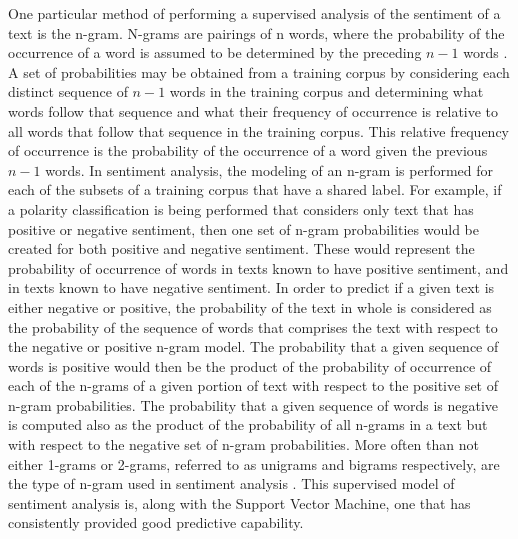 \documentclass[letterpaper, 10 pt, conference]{ieeeconf}
\begin{document}
One particular method of performing a supervised analysis of the sentiment of a text is the n-gram. N-grams are pairings of n words, where the probability of the occurrence of a word is assumed to be determined by the preceding $n-1$ words \textcolor{gray}{\cite{Zhou}}. A set of probabilities may be obtained from a training corpus by considering each distinct sequence of $n-1$ words in the training corpus and determining what words follow that sequence and what their frequency of occurrence is relative to all words that follow that sequence in the training corpus. This relative frequency of occurrence is the probability of the occurrence of a word given the previous $n-1$ words. In sentiment analysis, the modeling of an n-gram is performed for each of the subsets of a training corpus that have a shared label. For example, if a polarity classification is being performed that considers only text that has positive or negative sentiment, then one set of n-gram probabilities would be created for both positive and negative sentiment. These would represent the probability of occurrence of words in texts known to have positive sentiment, and in texts known to have negative sentiment. In order to predict if a given text is either negative or positive, the probability of the text in whole is considered as the probability of the sequence of words that comprises the text with respect to the negative or positive n-gram model. The probability that a given sequence of words is positive would then be the product of the probability of occurrence of each of the n-grams of a given portion of text with respect to the positive set of n-gram probabilities. The probability that a given sequence of words is negative is computed also as the product of the probability of all n-grams in a text but with respect to the negative set of n-gram probabilities. More often than not either 1-grams or 2-grams, referred to as unigrams and bigrams respectively, are the type of n-gram used in sentiment analysis \textcolor{gray}{\cite{PangLee,RaviRavi,Zhou}}. This supervised model of sentiment analysis is, along with the Support Vector Machine, one that has consistently provided good predictive capability.
\end{document}
